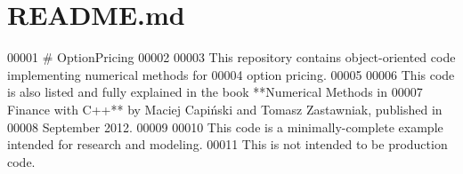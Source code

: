 \hypertarget{README_8md_source}{\section{R\+E\+A\+D\+M\+E.\+md}
}

\begin{DoxyCode}
00001 # OptionPricing
00002 
00003 This repository contains object-oriented code implementing numerical methods for
00004 option pricing.
00005 
00006 This code is also listed and fully explained in the book **Numerical Methods in
00007 Finance with C++** by Maciej Capiński and Tomasz Zastawniak, published in
00008 September 2012.
00009 
00010 This code is a minimally-complete example intended for research and modeling.
00011 This is not intended to be production code.
\end{DoxyCode}
